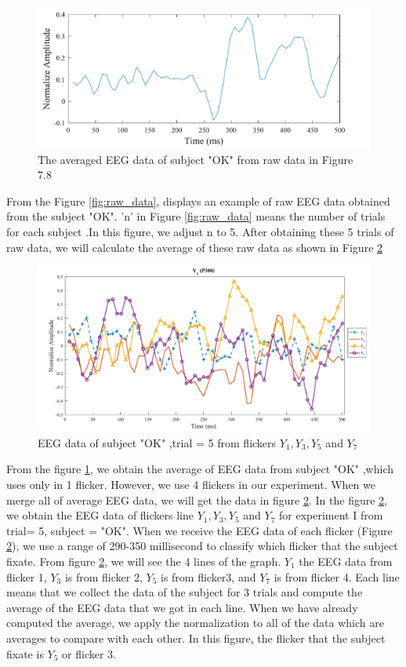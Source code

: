 \begin{figure}[ht]
	\centering
	\includegraphics[scale = 0.4]{chapter7/rawavg.pdf}
	\caption{The averaged EEG data of subject "OK" from raw data in Figure 7.8 }
		\label{fig:avg}
\end{figure}

From the Figure \ref{fig:raw_data}, displays an example of raw EEG data obtained from the  subject "OK". 'n' in Figure \ref{fig:raw_data} means the number of trials for each subject .In this figure, we adjust n to 5. After obtaining these 5 trials of raw data, we will calculate the average of these raw data as shown in Figure \ref{fig:yx}


\begin{figure}[ht]
	\centering
	\includegraphics[width=\textwidth]{chapter7/erp_result.pdf}
	\caption{EEG data of subject "OK" ,trial = 5 from flickers $Y_1,Y_3,Y_5$ and $Y_7$ }
		\label{fig:yx}
\end{figure}

From the figure \ref{fig:avg}, we obtain the average of EEG data from subject "OK" ,which uses only in 1 flicker. However, we use 4 flickers in our experiment. When we merge all of average EEG data, we will get the data in figure \ref{fig:yx}. In the figure \ref{fig:yx}, we obtain the EEG data of flickers line $Y_1,Y_3,Y_5$ and $Y_7$ for experiment I from trial= 5, subject = "OK". When we receive the EEG data of each flicker (Figure \ref{fig:yx}), we use a range of 290-350 millisecond to classify which flicker that the subject fixate. From figure \ref{fig:yx}, we will see the 4 lines of the graph. $Y_1$ the EEG data from flicker 1, $Y_3$ is from flicker 2, $Y_5$ is from flicker3, and $Y_7$ is from flicker 4. Each line means that we collect the data of the subject for 3 trials and compute the average of the EEG data that we got in each line. When we have already computed the average, we apply the normalization to all of the data which are averages to compare with each other. In this figure, the flicker that the subject fixate is $Y_5$ or flicker 3.

